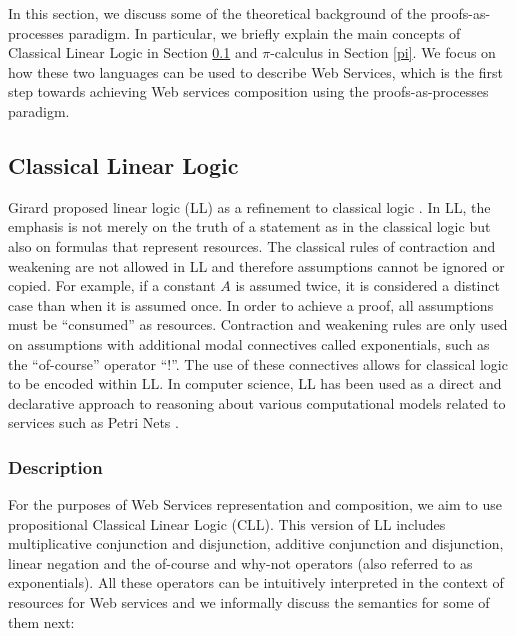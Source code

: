 \documentclass[copyright,creativecommons]{eptcs}
\begin{document}
In this section, we discuss some of the theoretical background of the proofs-as-processes paradigm. In particular, we briefly explain the main concepts of Classical Linear Logic in Section \ref{CLL} and $\pi$-calculus in Section \ref{pi}. We focus on how these two languages can be used to describe Web Services, which is the first step towards achieving Web services composition using the proofs-as-processes paradigm. 

\subsection{Classical Linear Logic}
\label{CLL}

Girard proposed linear logic (LL) as a refinement to classical logic \cite{girard1995linear}. In LL, the emphasis is not merely on the truth of a statement as in the classical logic but also on formulas that represent resources. The classical rules of contraction and weakening are not allowed in LL and therefore assumptions cannot be ignored or copied. For example, if a constant $A$ is assumed twice, it is considered a distinct case than when it is assumed once. In order to achieve a proof, all assumptions must be ``consumed'' as resources. Contraction and weakening rules are only used on assumptions with additional modal connectives called exponentials, such as the ``of-course'' operator ``!''. The use of these connectives allows for classical logic to be encoded within LL. In computer science, LL has been used as a direct and declarative approach to reasoning about various computational models related to services such as Petri Nets \cite{murata1989petri}.

\subsubsection{Description}
\label{CLLdesc} 

For the purposes of Web Services representation and composition, we aim to use propositional Classical Linear Logic (CLL). This version of LL includes multiplicative conjunction and disjunction, additive conjunction and disjunction, linear negation and the of-course and why-not operators (also referred to as exponentials). All these operators can be intuitively interpreted in the context of resources for Web services and we informally discuss the semantics for some of them next:
\end{document}
